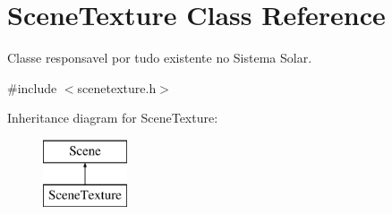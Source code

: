 \hypertarget{class_scene_texture}{}\section{Scene\+Texture Class Reference}
\label{class_scene_texture}


Classe responsavel por tudo existente no Sistema Solar.  




{\ttfamily \#include $<$scenetexture.\+h$>$}

Inheritance diagram for Scene\+Texture\+:\begin{figure}[H]
\begin{center}
\leavevmode
\includegraphics[height=2.000000cm]{class_scene_texture}
\end{center}
\end{figure}
